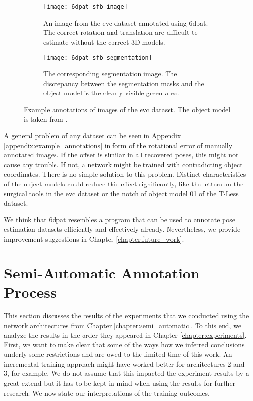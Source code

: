 \begin{figure}
	\begin{subfigure}[t]{0.47\textwidth}
		\centering
    	\texttt{[image: 6dpat\_sfb\_image]}
    	\caption{An image from the \ac{evc} dataset annotated using \ac{6dpat}. The correct rotation and translation are difficult to estimate without the correct 3D models.}
    	\label{fig:6dpat_sfb_image}
	\end{subfigure} 
	\hfill
	\begin{subfigure}[t]{0.47\textwidth}
		\centering
    	\texttt{[image: 6dpat\_sfb\_segmentation]}
    	\caption{The corresponding segmentation image. The discrepancy between the segmentation masks and the object model is the clearly visible green area.}
    	\label{fig:6dpat_sfb_segmentation}
	\end{subfigure} 
	\caption{Example annotations of images of the \ac{evc}  dataset. The object model is taken from \cite{3d_scalpel_online}.}
	\label{fig:6dpat_sfb}
\end{figure} 

A general problem of any dataset can be seen in Appendix \ref{appendix:example_annotations} in form of the rotational error of manually annotated images. If the offset is similar in all recovered poses, this might not cause any trouble. If not, a network might be trained with contradicting object coordinates. There is no simple solution to this problem. Distinct characteristics of the object models could reduce this effect significantly, like the letters on the surgical tools in the \ac{evc} dataset or the notch of object model 01 of the T-Less dataset.

We think that \ac{6dpat} resembles a program that can be used to annotate pose estimation datasets efficiently and effectively already. Nevertheless, we provide improvement suggestions in Chapter \ref{chapter:future_work}.

\section{Semi-Automatic Annotation Process}

This section discusses the results of the experiments that we conducted using the network architectures from Chapter \ref{chapter:semi_automatic}. To this end, we analyze the results in the order they appeared in Chapter \ref{chapter:experiments}. First, we want to make clear that some of the ways how we inferred conclusions underly some restrictions and are owed to the limited time of this work. An incremental training approach might have worked better for architectures 2 and 3, for example. We do not assume that this impacted the experiment results by a great extend but it has to be kept in mind when using the results for further research. We now state our interpretations of the training outcomes.

